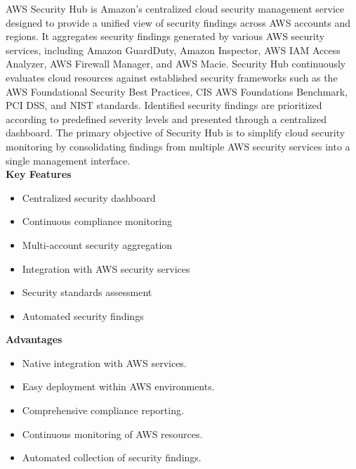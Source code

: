 AWS Security Hub is Amazon's centralized cloud security management service designed to provide a unified view of security findings across AWS accounts and regions. It aggregates security findings generated by various AWS security services, including Amazon GuardDuty, Amazon Inspector, AWS IAM Access Analyzer, AWS Firewall Manager, and AWS Macie. Security Hub continuously evaluates cloud resources against established security frameworks such as the AWS Foundational Security Best Practices, CIS AWS Foundations Benchmark, PCI DSS, and NIST standards. Identified security findings are prioritized according to predefined severity levels and presented through a centralized dashboard. The primary objective of Security Hub is to simplify cloud security monitoring by consolidating findings from multiple AWS security services into a single management interface.\\
\textbf{Key Features}

\begin{itemize}
\tightlist
\item
  Centralized security dashboard\\
\item
  Continuous compliance monitoring\\
\item
  Multi-account security aggregation\\
\item
  Integration with AWS security services\\
\item
  Security standards assessment\\
\item
  Automated security findings
\end{itemize}

\textbf{Advantages}

\begin{itemize}
\tightlist
\item
  Native integration with AWS services.\\
\item
  Easy deployment within AWS environments.\\
\item
  Comprehensive compliance reporting.\\
\item
  Continuous monitoring of AWS resources.\\
\item
  Automated collection of security findings.
\end{itemize}


